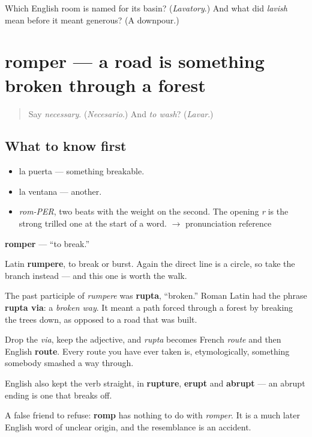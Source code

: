 \begin{tcolorbox}[breakable,colback=teal!4,colframe=teal!35!black,title={Before you move on}]
Which English room is named for its basin? (\emph{Lavatory}.) And what did \emph{lavish} mean before it meant generous? (A downpour.)
\end{tcolorbox}
\section[romper]{romper — a road is something broken through a forest}

\label{lesson:ES-C381-romper}



\begin{quote}
Say \emph{necessary}. (\emph{Necesario}.) And \emph{to wash}? (\emph{Lavar}.)
\end{quote}

\subsection*{What to know first}
\begin{itemize}
\raggedright
  \item la puerta — something breakable.
  \item la ventana — another.
\end{itemize}

\begin{sounds}
\begin{itemize}
\raggedright
  \item \emph{rom-PER}, two beats with the weight on the second. The opening \emph{r} is the strong trilled one at the start of a word. $\to$ pronunciation reference
\end{itemize}
\end{sounds}

\begin{cousinweb}
\textbf{romper} — \textquotedblleft{}to break.\textquotedblright{}

Latin \textbf{rumpere}, to break or burst. Again the direct line is a circle, so take the branch instead — and this one is worth the walk.

The past participle of \emph{rumpere} was \textbf{rupta}, \textquotedblleft{}broken.\textquotedblright{} Roman Latin had the phrase \textbf{rupta via}: a \emph{broken way}. It meant a path forced through a forest by breaking the trees down, as opposed to a road that was built.

Drop the \emph{via}, keep the adjective, and \emph{rupta} becomes French \emph{route} and then English \textbf{route}. Every route you have ever taken is, etymologically, something somebody smashed a way through.

English also kept the verb straight, in \textbf{rupture}, \textbf{erupt} and \textbf{abrupt} — an abrupt ending is one that breaks off.

A false friend to refuse: \textbf{romp} has nothing to do with \emph{romper}. It is a much later English word of unclear origin, and the resemblance is an accident.
\end{cousinweb}

